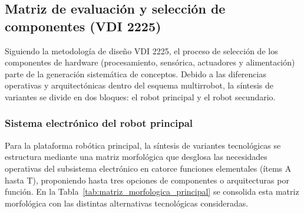 \subsection{Matriz de evaluación y selección de componentes (VDI 2225)}

Siguiendo la metodología de diseño VDI 2225, el proceso de selección de los componentes de hardware (procesamiento, sensórica, actuadores y alimentación) parte de la generación sistemática de conceptos. Debido a las diferencias operativas y arquitectónicas dentro del esquema multirrobot, la síntesis de variantes se divide en dos bloques: el robot principal y el robot secundario.

\subsubsection{Sistema electrónico del robot principal}

Para la plataforma robótica principal, la síntesis de variantes tecnológicas se estructura mediante una matriz morfológica que desglosa las necesidades operativas del subsistema electrónico en catorce funciones elementales (ítems A hasta T), proponiendo hasta tres opciones de componentes o arquitecturas por función. En la Tabla~\ref{tab:matriz_morfologica_principal} se consolida esta matriz morfológica con las distintas alternativas tecnológicas consideradas.

